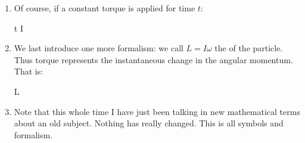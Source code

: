 \begin{enumerate}
  \item Of course, if a constant torque is applied for time $t$:

  \begin{nedqn}
    \tau t
  \eqcol
    I \Delta \omega
  \end{nedqn}

  \item We last introduce one more formalism: we call $L = I\omega$ the
   of the particle. Thus torque represents the
  instantaneous change in the angular momentum. That is:

  \begin{nedqn}
    \tau
  \eqcol
     L
  \end{nedqn}

  \item Note that this whole time I have just been talking in new
  mathematical terms about an old subject. Nothing has really changed.
  This is all symbols and formalism.
\end{enumerate}
